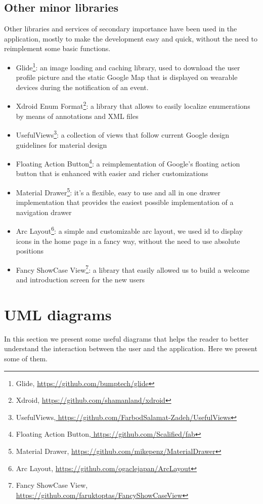 \documentclass[a4paper]{scrreprt}
\begin{document}
\section{Other minor libraries}
\par Other libraries and services of secondary importance have been used in the application, mostly to make the development easy and quick, without the need to reimplement some basic functions.
\begin{itemize}
\item Glide\footnote{Glide, \url{https://github.com/bumptech/glide}}: an image loading and caching library, used to download the user profile picture and the static Google Map that is displayed on wearable devices during the notification of an event.
\item Xdroid Enum Format\footnote{Xdroid, \url{https://github.com/shamanland/xdroid}}: a library that allows to easily localize enumerations by means of annotations and XML files
\item UsefulViews\footnote{UsefulViews,\url{ https://github.com/FarbodSalamat-Zadeh/UsefulViews}}: a collection of views that follow current Google design guidelines for material design
\item Floating Action Button\footnote{Floating Action Button,\url{ https://github.com/Scalified/fab}}: a reimplementation of Google's floating action button that is enhanced with easier and richer customizations
\item Material Drawer\footnote{Material Drawer, \url{https://github.com/mikepenz/MaterialDrawer}}: it's a flexible, easy to use and all in one drawer implementation that provides the easiest possible implementation of a navigation drawer
\item Arc Layout\footnote{Arc Layout, \url{https://github.com/ogaclejapan/ArcLayout}}: a simple and customizable arc layout, we used id to display icons in the home page in a fancy way, without the need to use absolute positions
\item Fancy ShowCase View\footnote{Fancy ShowCase View, \url{https://github.com/faruktoptas/FancyShowCaseView}}: a library that easily allowed us to build a welcome and introduction screen for the new users
\end{itemize}


\chapter{UML diagrams}
In this section we present some useful diagrams that helps the reader to better understand the interaction between the user and the application. Here we present some of them.
\end{document}
